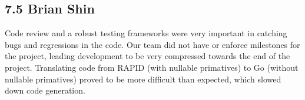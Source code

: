 \subsection*{7.5 Brian Shin}
Code review and a robust testing frameworks were very important in catching bugs and regressions in the code.
Our team did not have or enforce milestones for the project, leading development to be very compressed towards the end of the project.
Translating code from RAPID (with nullable primatives) to Go (without nullable primatives) proved to be more difficult than expected, which slowed down code generation.

